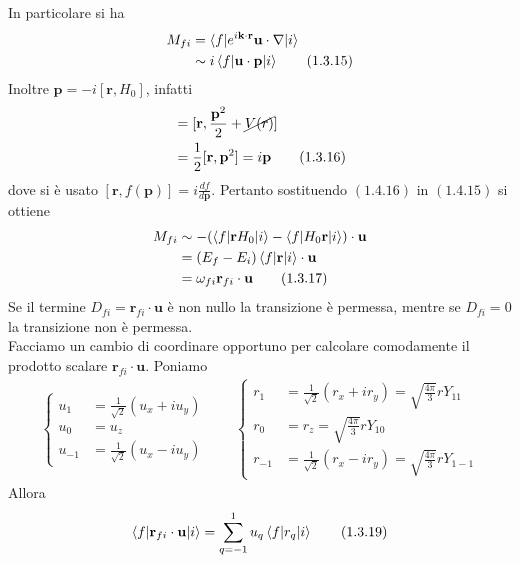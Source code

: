 \documentclass{article}
\begin{document}
In particolare si ha 
\begin{align}
    M_{fi} &= \braket{f|e^{i\mathbf{k} \cdot \mathbf{r}}\mathbf{u} \cdot \nabla|i} \notag \\
    &\sim i\braket{f|\mathbf{u} \cdot \mathbf{p}|i} \tag{1.3.15}
\end{align}
Inoltre $\mathbf{p} = -i[\mathbf{r}, H_0]$, infatti 
\begin{align}
    [\mathbf{r}, H_0] &= [\mathbf{r}, \frac{\mathbf{p}^2}{2} + \cancel{V(r)}] \notag \\
    &= \frac{1}{2}[\mathbf{r}, \mathbf{p}^2] = i\mathbf{p} \tag{1.3.16}
\end{align}
dove si è usato $[\mathbf{r}, f(\mathbf{p})] = i\frac{df}{d\mathbf{p}}$. Pertanto sostituendo $(1.4.16)$ in $(1.4.15)$ si ottiene 
\begin{align}
    M_{fi} &\sim -(\braket{f|\mathbf{r}H_0|i} - \braket{f|H_0\mathbf{r}|i}) \cdot \mathbf{u} \notag \\
    &= (E_f - E_i)\braket{f|\mathbf{r}|i} \cdot \mathbf{u} \notag \\
    &= \omega_{fi}\mathbf{r}_{fi} \cdot \mathbf{u} \tag{1.3.17}
\end{align}
Se il termine $D_{fi} = \mathbf{r}_{fi} \cdot \mathbf{u}$ è non nullo la transizione è permessa, mentre se $D_{fi} = 0$ la transizione non è permessa. \\
Facciamo un cambio di coordinare opportuno per calcolare comodamente il prodotto scalare $\mathbf{r}_{fi} \cdot \mathbf{u}$. Poniamo 
\begin{align}
    \begin{cases}
        u_1 &= \frac{1}{\sqrt{2}}(u_x + iu_y) \\
        u_0 &= u_z \\
        u_{-1} &= \frac{1}{\sqrt{2}}(u_x - iu_y) 
    \end{cases} \qquad 
    \begin{cases}
        r_1 &= \frac{1}{\sqrt{2}}(r_x + ir_y) = \sqrt{\frac{4\pi}{3}}rY_{11} \\
        r_0 &= r_z = \sqrt{\frac{4\pi}{3}}rY_{10} \\
        r_{-1} &= \frac{1}{\sqrt{2}}(r_x - ir_y) = \sqrt{\frac{4\pi}{3}}rY_{1-1}
    \end{cases} \tag{1.3.18}
\end{align}
Allora 
\begin{align}
    \braket{f|\mathbf{r}_{fi} \cdot \mathbf{u}|i} = \sum_{q = -1}^1 u_q\braket{f|r_q|i} \tag{1.3.19}
\end{align}
\end{document}

